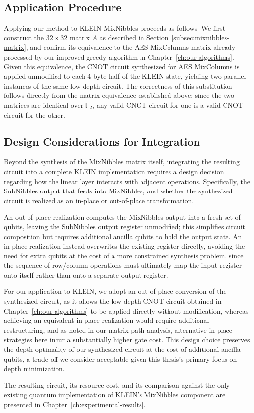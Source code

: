 \subsection{Application Procedure}
Applying our method to KLEIN MixNibbles proceeds as follows. We first construct the $32 \times 32$ matrix $A$ as described in Section~\ref{subsec:mixnibbles-matrix}, and confirm its equivalence to the AES MixColumns matrix already processed by our improved greedy algorithm in Chapter~\ref{ch:our-algorithms}. Given this equivalence, the CNOT circuit synthesized for AES MixColumns is applied unmodified to each 4-byte half of the KLEIN state, yielding two parallel instances of the same low-depth circuit. The correctness of this substitution follows directly from the matrix equivalence established above: since the two matrices are identical over $\mathbb{F}_{2}$​, any valid CNOT circuit for one is a valid CNOT circuit for the other.

\subsection{Design Considerations for Integration}
Beyond the synthesis of the MixNibbles matrix itself, integrating the resulting circuit into a complete KLEIN implementation requires a design decision regarding how the linear layer interacts with adjacent operations. Specifically, the SubNibbles output that feeds into MixNibbles, and whether the synthesized circuit is realized as an in-place or out-of-place transformation.

An out-of-place realization computes the MixNibbles output into a fresh set of qubits, leaving the SubNibbles output register unmodified; this simplifies circuit composition but requires additional ancilla qubits to hold the output state. An in-place realization instead overwrites the existing register directly, avoiding the need for extra qubits at the cost of a more constrained synthesis problem, since the sequence of row/column operations must ultimately map the input register onto itself rather than onto a separate output register.

For our application to KLEIN, we adopt an out-of-place conversion of the synthesized circuit, as it allows the low-depth CNOT circuit obtained in Chapter~\ref{ch:our-algorithms} to be applied directly without modification, whereas achieving an equivalent in-place realization would require additional restructuring, and as noted in our matrix path analysis, alternative in-place strategies here incur a substantially higher gate cost. This design choice preserves the depth optimality of our synthesized circuit at the cost of additional ancilla qubits, a trade-off we consider acceptable given this thesis's primary focus on depth minimization.

The resulting circuit, its resource cost, and its comparison against the only existing quantum implementation of KLEIN's MixNibbles component are presented in Chapter~\ref{ch:experimental-results}.